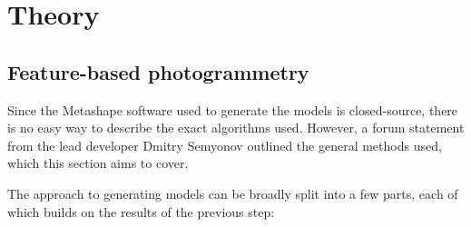 % 
% 
% 
% 

\chapter{Theory}


\section{Feature-based photogrammetry}

Since the Metashape software used to generate the models is closed-source, there is no easy way to describe the exact algorithms used.
However, a forum statement from the lead developer Dmitry Semyonov \parencite{metashapeForumPost} outlined the general methods used, which this section aims to cover.

The approach to generating models can be broadly split into a few parts, each of which builds on the results of the previous step:

